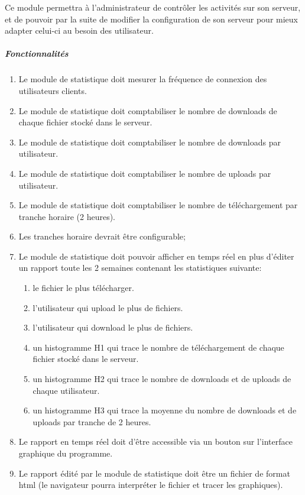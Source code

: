 \documentclass[10pt,a4paper]{report}
\begin{document}
	Ce module permettra à l'administrateur de contrôler les activités sur son serveur, et 	de pouvoir par la suite de modifier la configuration de son serveur pour mieux adapter celui-ci au besoin des utilisateur.

	\subparagraph{Fonctionnalités}

		\begin{enumerate}
			\item Le module de statistique doit mesurer la fréquence de connexion des utilisateurs clients.

			\item Le module de statistique doit comptabiliser le nombre de downloads de chaque fichier stocké dans le serveur.

			\item Le module de statistique doit comptabiliser le nombre de downloads par utilisateur.

			\item Le module de statistique doit comptabiliser le nombre de uploads par utilisateur.

			\item Le module de statistique doit comptabiliser le nombre de téléchargement par tranche horaire (2 heures).

			\item Les tranches horaire devrait être configurable;

			\item Le module de statistique doit pouvoir afficher en temps réel en plus d'éditer un rapport toute les 2 semaines contenant les statistiques suivante:

			\begin{enumerate}[label=\arabic*.]
				\item le fichier le plus télécharger.

				\item l'utilisateur qui upload le plus de fichiers.

				\item l'utilisateur qui download le plus de fichiers.

				\item un histogramme H1 qui trace le nombre de téléchargement de chaque fichier stocké dans le serveur.

				\item un histogramme H2 qui trace le nombre de downloads et de uploads de chaque utilisateur.

				\item un histogramme H3 qui trace la moyenne du nombre de downloads et de uploads par tranche de 2 heures.
			\end{enumerate}

			\item Le rapport en temps réel doit d'être accessible via un bouton sur l'interface graphique du programme.

			\item Le rapport édité par le module de statistique doit être un fichier de format html (le navigateur pourra interpréter le fichier et tracer les graphiques).
		\end{enumerate}
	
\end{document}
